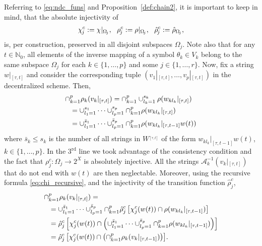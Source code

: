 \documentclass[a4paper, 10pt, conference]{ieeeconf}
\newcommand{\hspu}{\hspace{-1pt}}
\newcommand{\nato}{{\mathbb{N}_0}}
\newcommand{\taut}{{_{[\tau,t]}}}
\newcommand{\akl}{\mathcal{A}_k^{-1}}
\begin{document}
Referring to \eqref{eq:ndc_funs} and Proposition~\ref{def:chain2}, it is important to keep in mind, that the absolute injectivity of
\begin{align}\label{eq:ndc_funs_j}
\chi^c_{\hspu j}:=\chi|{_{\Omega_{\hspu j}}},~~\rho^c_{\hspu j}:=\rho|{_{\Omega_{\hspu j}}},~~\hat{\rho}^c_{\hspu j}:=\hat\rho_{\Omega_{\hspu j}},
\end{align}
is, per construction, preserved in all disjoint subspaces $\Omega_j$. Note also that for any $t\in\nato$, all elements of the inverse mapping of a symbol $\theta_k\in V_k$ belong to the same subspace $\Omega_j$ for each $k\in\{1,\ldots,p\}$ and some $j\in\{1,\ldots,r\}$. Now, fix a string $w|\taut$ and consider the corresponding tuple $(v_1|\taut,\dots, v_p|\taut)$ in the decentralized scheme. Then,
\begin{align*}
\cap_{k=1}^{p}\rho_k(v_k|\taut)&= \cap_{k=1}^{p}\cup_{l_k=1}^{s_k}\rho(w_{kl_k}|\taut)\\
{} & \hspace{-2cm}{= \cup_{l_1=1}^{s_1}\cdots \cup_{l_p=1}^{s_p} \cap_{k=1}^p\rho(w_{kl_k}|_{[\tau,t]})}\\
{} & \hspace{-2cm}{= \cup_{l_1=1}^{\bar{s}_1}\cdots \cup_{l_p=1}^{\bar{s}_p} \cap_{k=1}^p\rho( w_{kl_k}|_{[\tau,t-1]}w(t))}
\end{align*}
where $\bar{s}_k\leq s_k$ is the number of all strings in $W^{\taut}$ of the form $w_{kl_k}|_{[\tau,t-1]}w(t)$, $k\in\{1,\dots,p\}$. In the $3^\text{rd}$ line we took advantage of the consistency condition and the fact that $\rho^c_j: \Omega_j \to 2^{X}$ is absolutely injective. All the strings $\akl(v_k|\taut)$ that do not end with $w(t)$ are then neglectable. Moreover, using the recursive formula \eqref{eq:chi_recursive}, and the injectivity of the transition function $\hat\rho^c_j$,
\begin{align*}
\cap_{k=1}^{p}\rho_k(v_k|\taut)&=  \\
{} & \hspace{-2cm}{= \cup_{l_1=1}^{\bar{s}_1}\cdots \cup_{l_p=1}^{\bar{s}_p} \cap_{k=1}^p\hat{\rho}^c_{j}\left[{\chi}^c_j(w(t))\cap\rho(w_{kl_k}|_{[\tau,t-1]})\right]}\\
{} & \hspace{-2cm}{= \hat{\rho}^c_{j}\left[{\chi}^c_j(w(t))\cap \left(\cup_{l_1=1}^{\bar{s}_1}\cdots \cup_{{l}_p=1}^{\bar{s}_p} \cap_{k=1}^p \rho(w_{kl_k}|_{[\tau,t-1]})\right)\right]}\\
{} & \hspace{-2cm}{= \hat{\rho}^c_{j}\left[{\chi}^c_j(w(t))\cap \left(\cap_{k=1}^{p} \rho_k(v_k|_{[\tau,t-1]})\right)\right]}.
\end{align*}
\end{document}
